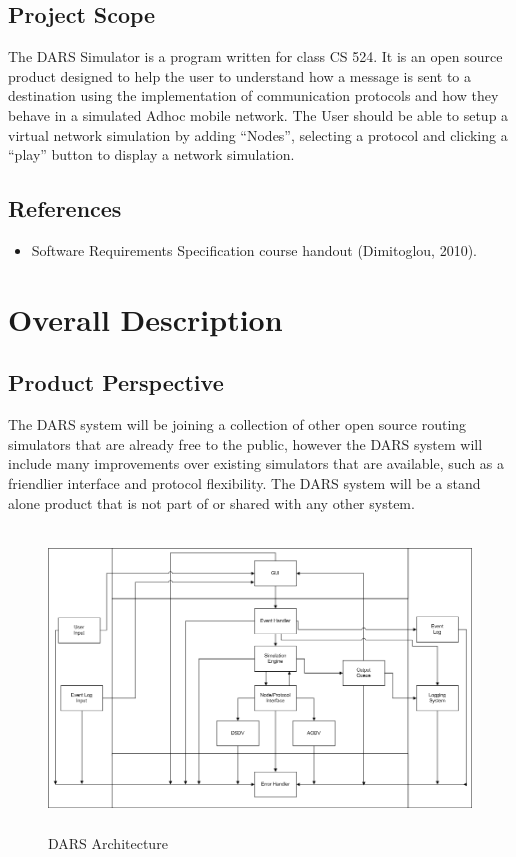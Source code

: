 \documentclass[a4paper,11pt,titlepage]{article}
\begin{document}
\subsection{Project Scope}
The DARS Simulator is a program written for class CS 524. It is an open source product
designed to help the user to understand how a message is sent to a destination using
the implementation of communication protocols and how they behave in a simulated
Adhoc mobile network. The User should be able to setup a virtual network simulation
by adding ``Nodes'', selecting a protocol and clicking a ``play'' button to display a network
simulation.

\subsection{References}
\begin{itemize}
  \item Software Requirements Specification course handout (Dimitoglou, 2010).
\end{itemize}

\section{Overall Description}
\subsection{Product Perspective}
The DARS system will be joining a collection of other open source routing simulators that are
already free to the public, however the DARS system will include many improvements over
existing simulators that are available, such as a friendlier interface and protocol flexibility. The
DARS system will be a stand alone product that is not part of or shared with any other system.

\begin{figure}[!ht]
        \centering
	\label{DARS Architecture} 
        \includegraphics[height=80mm]{img/arch.png}
        \caption{DARS Architecture}
\end{figure}
\end{document}
